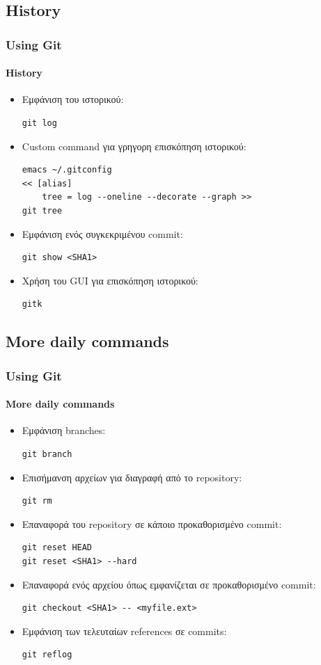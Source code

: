 \documentclass[handout]{beamer}
\begin{document}
\subsection{History}

\begin{frame}[fragile]
  \frametitle{Using Git}
  \framesubtitle{History}
  \begin{itemize}
    \item Εμφάνιση του ιστορικού:
\begin{verbatim}
git log
\end{verbatim}
    \item Custom command για γρηγορη επισκόπηση ιστορικού:
\begin{verbatim}
emacs ~/.gitconfig
<< [alias]	
	tree = log --oneline --decorate --graph >>
git tree
\end{verbatim}
    \item Εμφάνιση ενός συγκεκριμένου commit:
\begin{verbatim}
git show <SHA1>
\end{verbatim}
    \item Χρήση του GUI για επισκόπηση ιστορικού:
\begin{verbatim}
gitk
\end{verbatim}
  \end{itemize}
\end{frame}

\subsection{More daily commands}

\begin{frame}[fragile]
  \frametitle{Using Git}
  \framesubtitle{More daily commands}
  \begin{itemize}
    \item Εμφάνιση branches:
\begin{verbatim}
git branch
\end{verbatim}
    \item Επισήμανση αρχείων για διαγραφή από το repository:
\begin{verbatim}
git rm
\end{verbatim}
    \item Επαναφορά του repository σε κάποιο προκαθορισμένο commit:
\begin{verbatim}
git reset HEAD
git reset <SHA1> --hard
\end{verbatim}
    \item Επαναφορά ενός αρχείου όπως εμφανίζεται σε προκαθορισμένο commit:
\begin{verbatim}
git checkout <SHA1> -- <myfile.ext>
\end{verbatim}
    \item Εμφάνιση των τελευταίων references σε commits:
\begin{verbatim}
git reflog
\end{verbatim}
  \end{itemize}
\end{frame}
\end{document}
